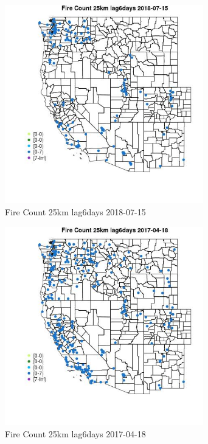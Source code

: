 \begin{figure} 
\centering  
\includegraphics[width=0.77\textwidth]{Code_Outputs/Report_ML_input_PM25_Step4_part_e_de_duplicated_aves_compiled_2019-05-20wNAs_MapObsFire_Count_25km_lag6days2018-07-15.jpg} 
\caption{\label{fig:Report_ML_input_PM25_Step4_part_e_de_duplicated_aves_compiled_2019-05-20wNAsMapObsFire_Count_25km_lag6days2018-07-15}Fire Count 25km lag6days 2018-07-15} 
\end{figure} 
 

\begin{figure} 
\centering  
\includegraphics[width=0.77\textwidth]{Code_Outputs/Report_ML_input_PM25_Step4_part_e_de_duplicated_aves_compiled_2019-05-20wNAs_MapObsFire_Count_25km_lag6days2017-04-18.jpg} 
\caption{\label{fig:Report_ML_input_PM25_Step4_part_e_de_duplicated_aves_compiled_2019-05-20wNAsMapObsFire_Count_25km_lag6days2017-04-18}Fire Count 25km lag6days 2017-04-18} 
\end{figure} 
 

